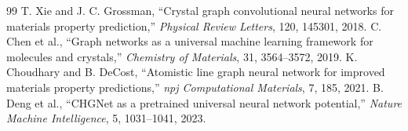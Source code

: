 \documentclass[12pt,a4paper]{article}
\begin{document}
\begin{thebibliography}{99}
 T. Xie and J. C. Grossman, ``Crystal graph convolutional neural networks for materials property prediction,'' \textit{Physical Review Letters}, 120, 145301, 2018.
 C. Chen et al., ``Graph networks as a universal machine learning framework for molecules and crystals,'' \textit{Chemistry of Materials}, 31, 3564--3572, 2019.
 K. Choudhary and B. DeCost, ``Atomistic line graph neural network for improved materials property predictions,'' \textit{npj Computational Materials}, 7, 185, 2021.
 B. Deng et al., ``CHGNet as a pretrained universal neural network potential,'' \textit{Nature Machine Intelligence}, 5, 1031--1041, 2023.
\end{thebibliography}
\normalsize
\end{document}
